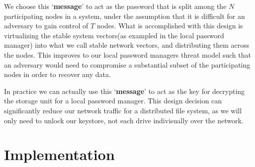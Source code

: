 \documentclass[11pt]{article} %
\def\ssv{stable system vectors\xspace}
\def\snv{stable network vectors\xspace}
\def\pm{password manager\xspace}
\def\lpm{local \pm}
\def\tm{threat model\xspace}
\def\m{`{\bf message}'\xspace}
\begin{document}
We choose this \m to act as the password that is split among the \(N\) participating nodes in a system, under the assumption that it is difficult for an adversary to gain control of \(T\) nodes. What is accomplished with this design is virtualizing the \ssv (as exampled in the \lpm) into what we call \snv, and distributing them across the nodes. This improves to our \lpm{s} \tm such that an adversary would need to compromise a substantial subset of the participating nodes in order to recover any data. 

In practice we can actually use this \m to act as the key for decrypting the storage unit for a \lpm. This design decision can significantly reduce our network traffic for a distributed file system, as we will only need to unlock our keystore, not each drive indivisually over the network. 

\section*{Implementation}
\end{document}
